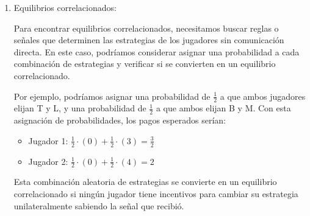 \documentclass[11pt]{article}
\begin{document}
\begin{enumerate}
    \item Equilibrios correlacionados:
    
    Para encontrar equilibrios correlacionados, necesitamos buscar reglas o señales que determinen las estrategias de los jugadores sin comunicación directa. En este caso, podríamos considerar asignar una probabilidad a cada combinación de estrategias y verificar si se convierten en un equilibrio correlacionado.
    
    Por ejemplo, podríamos asignar una probabilidad de $\frac{1}{2}$ a que ambos jugadores elijan T y L, y una probabilidad de $\frac{1}{2}$ a que ambos elijan B y M. Con esta asignación de probabilidades, los pagos esperados serían:
    \begin{itemize}
    \item Jugador 1: $\frac{1}{2} \cdot (0) + \frac{1}{2} \cdot (3) = \frac{3}{2}$
    \item Jugador 2: $\frac{1}{2} \cdot (0) + \frac{1}{2} \cdot (4) = 2$
    \end{itemize}
    
    Esta combinación aleatoria de estrategias se convierte en un equilibrio correlacionado si ningún jugador tiene incentivos para cambiar su estrategia unilateralmente sabiendo la señal que recibió.
    
\end{enumerate}
\end{document}
